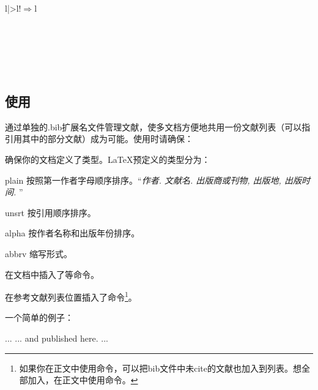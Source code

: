 \begin{table}[!hbt]
\begin{tabular}{l|>{\ttfamily}l!{$\Rightarrow$}l}
 \\
\hline
{} \\
\hline
{} \\
\hline
{} \\
\hline
{} \\
\hline
{} \\
\hline
\end{tabular}
\end{table}

\subsection{\bibtex 使用}
\bibtex 通过单独的.bib扩展名文件管理文献，使多文档方便地共用一份文献列表（可以指引用其中的部分文献）成为可能。使用时请确保：
\begin{feae}
\item 确保你的文档定义了类型。\LaTeX 预定义的类型分为：
  \begin{para}
    \item[plain] 按照第一作者字母顺序排序。“\textit{作者. 文献名. 出版商或刊物, 出版地, 出版时间.} ”
    \item[unsrt] 按引用顺序排序。
    \item[alpha] 按作者名称和出版年份排序。
    \item[abbrv] 缩写形式。
  \end{para}
\item 在文档中插入了等命令。
\item 在参考文献列表位置插入了命令\footnote{如果你在正文中使用命令，可以把bib文件中未cite的文献也加入到列表。想全部加入，在正文中使用命令。}。
\end{feae}

一个简单的例子：
\begin{latex}


    ...
    ... and published here\cite{Smith93TRB}.
    ...
    

\end{latex}

